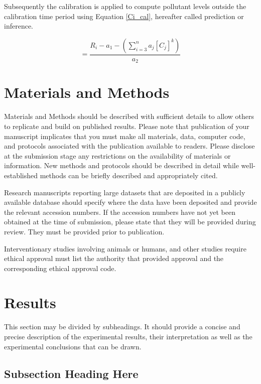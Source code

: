 \documentclass[sensors,article,submit,moreauthors,pdftex]{mdpi}
\begin{document}
Subsequently the calibration is applied to compute pollutant levels
outside the calibration time period using Equation \eqref{Ci_cal},
hereafter called prediction or inference.

\begin{equation}
[C_i] = \frac {R_i-a_1 -(\sum_{i=3}^{n} a_j [C_j]^k)}{a_2}
\label{Ci_cal}
\end{equation}

\section{Materials and Methods}\label{materials-and-methods}

Materials and Methods should be described with sufficient details to
allow others to replicate and build on published results. Please note
that publication of your manuscript implicates that you must make all
materials, data, computer code, and protocols associated with the
publication available to readers. Please disclose at the submission
stage any restrictions on the availability of materials or information.
New methods and protocols should be described in detail while
well-established methods can be briefly described and appropriately
cited.

Research manuscripts reporting large datasets that are deposited in a
publicly available database should specify where the data have been
deposited and provide the relevant accession numbers. If the accession
numbers have not yet been obtained at the time of submission, please
state that they will be provided during review. They must be provided
prior to publication.

Interventionary studies involving animals or humans, and other studies
require ethical approval must list the authority that provided approval
and the corresponding ethical approval code.

\section{Results}\label{results}

This section may be divided by subheadings. It should provide a concise
and precise description of the experimental results, their
interpretation as well as the experimental conclusions that can be
drawn.

\subsection{Subsection Heading Here}\label{subsection-heading-here}
\end{document}
